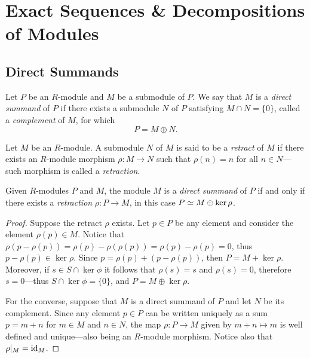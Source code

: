 \section{Exact Sequences \& Decompositions of Modules}

\subsection{Direct Summands}

\begin{definition}
\label{def:direct-summand}
Let \(P\) be an \(R\)-module and \(M\) be a submodule of \(P\). We say that
\(M\) is a \emph{direct summand} of \(P\) if there exists a submodule \(N\) of
\(P\) satisfying \(M \cap N = \{0\}\), called a \emph{complement} of \(M\), for
which
\[
P = M \oplus N.
\]
\end{definition}

\begin{definition}[Retract]
\label{def:retract-module}
Let \(M\) be an \(R\)-module. A submodule \(N\) of \(M\) is said to be a
\emph{retract} of \(M\) if there exists an \(R\)-module morphism
\(\rho: M \to N\) such that \(\rho(n) = n\) for all \(n \in N\)---such
morphism is called a \emph{retraction}.
\end{definition}

\begin{proposition}
\label{prop:direct-summand-iff-retraction}
Given \(R\)-modules \(P\) and \(M\), the module \(M\) is a \emph{direct summand}
of \(P\) if and only if there exists a \emph{retraction} \(\rho: P \to M\), in
this case \(P \simeq M \oplus \ker \rho\).
\end{proposition}

\begin{proof}
Suppose the retract \(\rho\) exists. Let \(p \in P\) be any element and consider
the element \(\rho(p) \in M\). Notice that
\(\rho(p - \rho(p)) = \rho(p) - \rho(\rho(p)) = \rho(p) - \rho(p) = 0\), thus
\(p - \rho(p) \in \ker \rho\). Since \(p = \rho(p) + (p - \rho(p))\), then
\(P = M + \ker \rho\). Moreover, if \(s \in S \cap \ker \phi\) it follows that
\(\rho(s) = s\) and \(\rho(s) = 0\), therefore \(s = 0\)---thus
\(S \cap \ker \phi = \{0\}\), and \(P = M \oplus \ker \rho\).

For the converse, suppose that \(M\) is a direct summand of \(P\) and let \(N\)
be its complement. Since any element \(p \in P\) can be written uniquely as a
sum \(p = m + n\) for \(m \in M\) and \(n \in N\), the map \(\rho: P \to M\)
given by \(m + n \mapsto m\) is well defined and unique---also being an
\(R\)-module morphism. Notice also that \(\rho|_M = \operatorname{id}_M\).
\end{proof}

